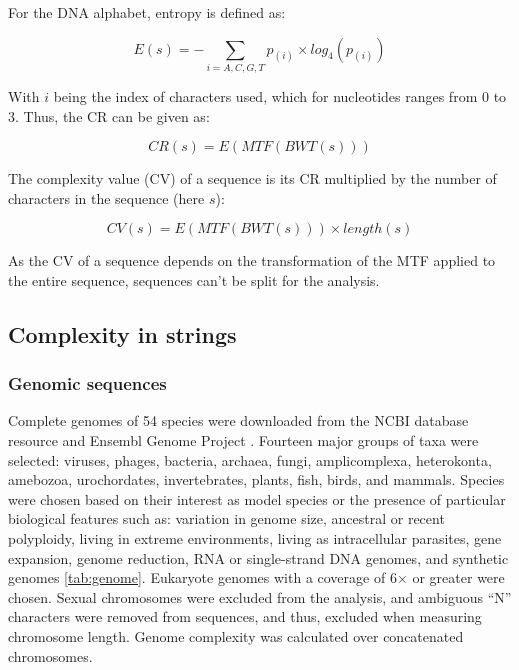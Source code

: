 For the  DNA alphabet, entropy is defined as:

\begin{equation} \label{eq:entropy}
E(s) = -\sum_{i=A,C,G,T}p_{(i)} \times log_4(p_{(i)})
\end{equation}

With $i$ being the index of characters used, which for nucleotides ranges from 0 to 3. Thus, the CR can be given as:

\begin{equation} \label{eq:cr}
CR(s) = E(MTF(BWT(s)))
\end{equation}

The complexity value (CV) of a sequence is its CR multiplied by the number of characters in the sequence (here $s$):

\begin{equation} \label{eq:cv}
CV(s) = E(MTF(BWT(s))) \times length(s)
\end{equation}

As the CV of a sequence depends on the transformation of the MTF applied to the entire sequence, sequences can't be split for the analysis.

\subsection{Complexity in strings}
\label{sec:complexity-strings}

\subsubsection{Genomic sequences}
\label{sec:genomic-sequences}

Complete genomes of 54 species were downloaded from the NCBI database resource \cite{Sayers2009} and Ensembl Genome Project \cite{Flicek2011}. Fourteen major groups of taxa were selected: viruses, phages, bacteria, archaea, fungi, amplicomplexa, heterokonta, amebozoa, urochordates, invertebrates, plants, fish, birds, and mammals. Species were chosen based on their interest as model species or the presence of particular biological features such as: variation in genome size, ancestral or recent polyploidy, living in extreme environments, living as intracellular parasites, gene expansion, genome reduction, RNA or single-strand DNA genomes, and synthetic genomes \autoref{tab:genome}. Eukaryote genomes with a coverage of 6$\times$ or greater were chosen. Sexual chromosomes were excluded from the analysis, and ambiguous ``N'' characters were removed from sequences, and thus, excluded when measuring chromosome length. Genome complexity was calculated over concatenated chromosomes.

